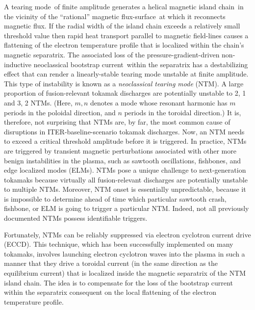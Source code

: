 \documentclass[12pt,prb,aps]{revtex4-1}
\begin{document}
A tearing mode\,\cite{tear1} of finite amplitude generates a helical magnetic island chain\,\cite{ntm1} in the vicinity of the ``rational''  magnetic flux-surface\,\cite{ideal3} at which it reconnects magnetic flux.
If the radial width of the island chain exceeds a relatively small threshold value then rapid  heat transport parallel to magnetic field-lines causes a flattening of the  electron temperature profile
that is localized within the chain's magnetic separatrix.\cite{ntm2} The associated loss of the pressure-gradient-driven non-inductive neoclassical bootstrap current\,\cite{ntm3} within the separatrix
has a destabilizing effect that can render a linearly-stable tearing mode unstable at finite amplitude. This type of instability is known as a {\em neoclassical tearing mode}\/  (NTM).\cite{tftr,ntm4c,ntm4b,ntm4a}  A large proportion of fusion-relevant tokamak
discharges are potentially unstable  to 2, 1 and 3, 2 NTMs.\cite{ntm4,ntm5}  (Here, $m, n$ denotes a mode whose resonant harmonic has $m$ periods in the poloidal
direction, and $n$ periods in the toroidal direction.) It is, therefore, not  surprising that NTMs are, by far, the most common cause of disruptions in ITER-baseline-scenario tokamak
discharges.\cite{iter,ntm4,ntm5,vries}
Now, an NTM needs to exceed a critical  threshold amplitude
before it is triggered. In practice, NTMs are
triggered by transient magnetic perturbations associated with other more benign instabilities in the plasma, such as sawtooth oscillations, fishbones, and
edge localized modes (ELMs).\cite{ntm4,ntm5,sawtooth,elm} NTMs pose a unique challenge to next-generation tokamaks  because  virtually all fusion-relevant discharges 
are potentially unstable to multiple NTMs. Moreover, NTM onset is essentially unpredictable, because it
is impossible to determine ahead of time which particular sawtooth crash, fishbone, or ELM is going to trigger a particular NTM.\cite{nstx} Indeed, not all previously documented NTMs possess identifiable
triggers.\cite{ntm6} 

Fortunately, NTMs can be reliably suppressed via electron cyclotron current drive (ECCD).\cite{zohm,prater} This technique, which has been
successfully implemented on many tokamaks,\cite{eccd1,eccd2,eccd3,eccd3a,eccd3b,eccd4,eccd5} involves
launching electron cyclotron waves into the plasma in such a manner that they drive a toroidal current (in the same direction as the equilibrium current) that is 
localized  inside the magnetic separatrix of
the NTM island chain. The idea is to compensate for the loss of the bootstrap current within the separatrix consequent on the local flattening
of the electron temperature profile.\cite{ntm4,ntm5} 
\end{document}
